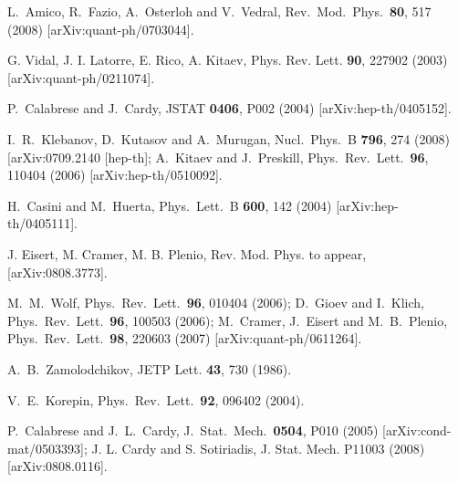 \documentclass[a4paper]{article}
\begin{document}
\begin{thebibliography}{99}
L.~Amico, R.~Fazio, A.~Osterloh and V.~Vedral,
  Rev.\ Mod.\ Phys.\  {\bf 80}, 517 (2008)
  [arXiv:quant-ph/0703044].




 G. Vidal, J. I. Latorre, E. Rico, A. Kitaev, Phys. Rev. Lett. {\bf 90}, 227902 (2003) [arXiv:quant-ph/0211074].




P.~Calabrese and J.~Cardy,
JSTAT {\bf 0406}, P002 (2004)
[arXiv:hep-th/0405152].


  I.~R.~Klebanov, D.~Kutasov and A.~Murugan,
  Nucl.\ Phys.\  B {\bf 796}, 274 (2008)
  [arXiv:0709.2140 [hep-th];
  A.~Kitaev and J.~Preskill,
  Phys.\ Rev.\ Lett.\  {\bf 96}, 110404 (2006)
  [arXiv:hep-th/0510092].


H.~Casini and M.~Huerta,
Phys.\ Lett.\ B {\bf 600}, 142 (2004)
[arXiv:hep-th/0405111].

 J. Eisert, M. Cramer, M. B. Plenio, Rev. Mod. Phys. to appear,  [arXiv:0808.3773].


M.~M.~Wolf,
  Phys.\ Rev.\ Lett.\  {\bf 96}, 010404 (2006);
  D.~Gioev and I.~Klich,
  Phys.\ Rev.\ Lett.\  {\bf 96}, 100503 (2006);
  M.~Cramer, J.~Eisert and M.~B.~Plenio,
  Phys.\ Rev.\ Lett.\  {\bf 98}, 220603 (2007)
  [arXiv:quant-ph/0611264]. 

A.~B.~Zamolodchikov, JETP Lett. {\bf 43}, 730 (1986).

  V.~E.~Korepin,
  Phys.\ Rev.\ Lett.\  {\bf 92}, 096402 (2004).



  P.~Calabrese and J.~L.~Cardy,
  J.\ Stat.\ Mech.\  {\bf 0504}, P010 (2005)
  [arXiv:cond-mat/0503393]; 
 J. L. Cardy and S. Sotiriadis, J. Stat. Mech. P11003 (2008) [arXiv:0808.0116].







\end{thebibliography}
\end{document}
